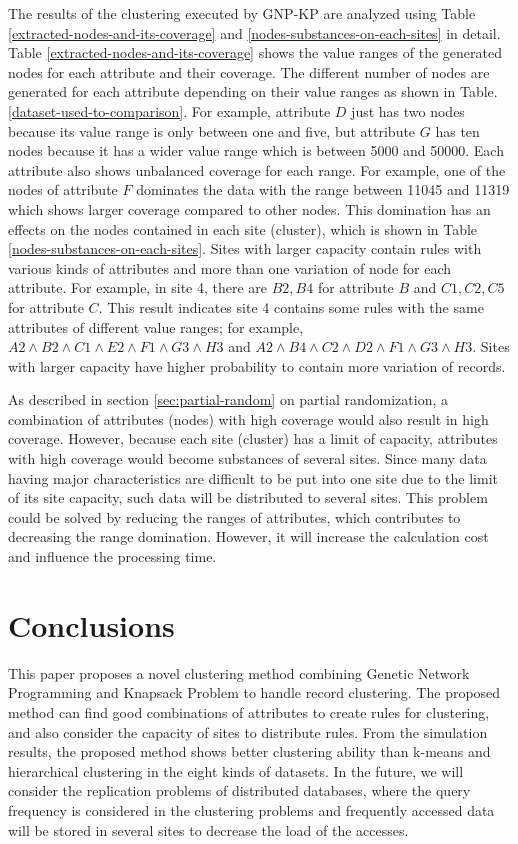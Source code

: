 \documentclass{elsart}
\begin{document}
The results of the clustering executed by GNP-KP are analyzed using Table \ref{extracted-nodes-and-its-coverage} and \ref{nodes-substances-on-each-sites} in detail. Table \ref{extracted-nodes-and-its-coverage} shows the value ranges of the generated nodes for each attribute and their coverage. The different number of nodes are generated for each attribute depending on their value ranges as shown in Table. \ref{dataset-used-to-comparison}. For example, attribute $D$ just has two nodes because its value range is only between one and five, but attribute $G$ has ten nodes because it has a wider value range which is between 5000 and 50000. Each attribute also shows unbalanced coverage for each range. For example, one of the nodes of attribute $F$ dominates the data with the range between 11045 and 11319 which shows larger coverage compared to other nodes. This domination has an effects on the nodes contained in each site (cluster), which is shown in Table \ref{nodes-substances-on-each-sites}. Sites with larger capacity contain rules with various kinds of attributes and more than one variation of node for each attribute. For example, in site 4, there are ${B2,B4}$ for attribute $B$ and ${C1,C2,C5}$ for attribute $C$. This result indicates site 4 contains some rules with the same attributes of different value ranges; for example, $A2\wedge B2\wedge C1\wedge E2\wedge F1\wedge G3\wedge H3$ and $A2\wedge B4\wedge C2\wedge D2\wedge F1\wedge G3\wedge H3$. Sites with larger capacity have higher probability to contain more variation of records.

As described in section \ref{sec:partial-random} on partial randomization, a combination of attributes (nodes) with high coverage would also result in high coverage. However, because each site (cluster) has a limit of capacity, attributes with high coverage would become substances of several sites. Since many data having major characteristics are difficult to be put into one site due to the limit of its site capacity, such data will be distributed to several sites. This problem could be solved by reducing the ranges of attributes, which contributes to decreasing the range domination. However, it will increase the calculation cost and influence the processing time.

\section{Conclusions}
This paper proposes a novel clustering method combining Genetic Network Programming and Knapsack Problem to handle record clustering. The proposed method can find  good combinations of attributes to create rules for clustering, and also consider the capacity of sites to distribute rules. From the simulation results, the proposed method shows better clustering ability than k-means and hierarchical clustering in the eight kinds of datasets. In the future, we will consider the replication problems of distributed databases, where the query frequency is considered in the clustering problems and frequently accessed data will be stored in several sites to decrease the load of the accesses.





\end{document}
